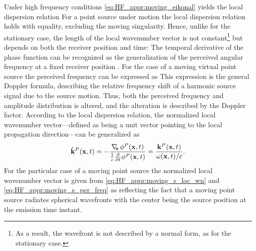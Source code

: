 Under high frequency conditions \eqref{eq:HF_appr:moving_eikonal} yields the local dispersion relation 
For a point source under motion the local dispersion relation holds with equality, excluding the moving singularity.
Hence, unlike for the stationary case, the length of the local wavenumber vector is not constant\footnote{As a result, the wavefront is not described by a normal form, as for the stationary case.} but depends on both the receiver position and time:
The temporal derivative of the phase function can be recognized as the generalization of the perceived angular frequency at a fixed receiver position \cite{Morse1968}.
For the case of a moving virtual point source the perceived frequency can be expressed as 
This expression is the general Doppler formula, describing the relative frequency shift of a harmonic source signal due to the source motion\cite{Morse1968}. 
Thus, both the perceived frequency and amplitude distribution is altered, and the alteration is described by the Doppler factor.
According to the local dispersion relation, the normalized local wavenumber vector---defined as being a unit vector pointing to the local propagation direction---can be generalized as
\begin{equation}
\label{eq:Moving_source:local_wn_general}
\hat{\mathbf{k}}^P(\mathbf{x},t) = -\frac{\nabla_{\!\!\mathbf{x}}\, \phi^P(\mathbf{x},t)}{\frac{1}{c}\frac{\partial}{\partial t} \phi^P(\mathbf{x},t)}  = \frac{\mathbf{k}^P(\mathbf{x},t)}{ \omega(\mathbf{x},t)/c }.
\end{equation}
For the particular case of a moving point source the normalized local wavenumber vector is given from \eqref{eq:HF_appr:moving_s_loc_wn} and \eqref{eq:HF_appr:moving_s_per_freq} as
reflecting the fact that a moving point source radiates spherical wavefronts with the center being the source position at the emission time instant.
